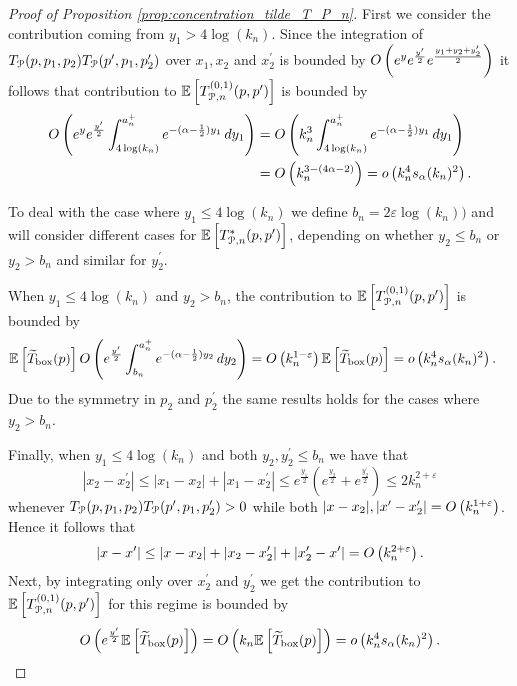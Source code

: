 \begin{proof}[Proof of Proposition \ref{prop:concentration_tilde_T_P_n}]
First we consider the contribution coming from $y_1 > 4 \log(k_n)$. Since the integration of $T_{{\mathcal P}}(p,p_1,p_2) T_{{\mathcal P}}(p^\prime,p_1,p_2^\prime)$ over $x_1, x_2$ and $x_2^\prime$ is bounded by $O\left(e^{y}e^{\frac{y^\prime}{2}} e^{\frac{y_1 + y_2 + y_2^\prime}{2}}\right)$ it follows that contribution to $\mathbb{E}\left[T^{(0,1)}_{{\mathcal P},n}(p,p^\prime)\right]$ is bounded by
\begin{align*}
	O\left(e^{y}e^{\frac{y^\prime}{2}} \int_{4\log(k_n)}^{a_n^+} e^{-(\alpha - \frac{1}{2})y_1} \, dy_1\right)
	&= O\left(k_n^3 \int_{4\log(k_n)}^{a_n^+} e^{-(\alpha - \frac{1}{2})y_1} \, dy_1\right)\\
	&= O\left(k_n^{3 - (4\alpha - 2)}\right) = o\left(k_n^4 s_\alpha(k_n)^2\right).
\end{align*}

To deal with the case where $y_1 \le 4\log(k_n)$ we define $b_n = 2\varepsilon\log(k_n))$ and will consider different cases for $\mathbb{E}\left[T^\ast_{{\mathcal P},n}(p,p^\prime)\right]$, depending on whether $y_2 \le b_n$ or $y_2 > b_n$ and similar for $y_2^\prime$. 

When $y_1 \le 4\log(k_n)$ and $y_2 > b_n$, the contribution to $\mathbb{E}\left[T^{(0,1)}_{{\mathcal P},n}(p,p^\prime)\right]$ is bounded by
\begin{align*}
	\mathbb{E}\left[\widetilde{T}_{\text{box}}(p)\right]
		O\left(e^{\frac{y^\prime}{2}}\int_{b_n}^{a_n^+} e^{-(\alpha -\frac{1}{2})y_2} \, dy_2\right)
	&= O\left(k_n^{1 - \varepsilon}\right)\mathbb{E}\left[\widetilde{T}_{\text{box}}(p)\right]
	= o\left(k_n^4 s_\alpha(k_n)^2\right).
\end{align*}
Due to the symmetry in $p_2$ and $p_2^\prime$ the same results holds for the cases where $y_2 > b_n$.

Finally, when $y_1 \le 4\log(k_n)$ and both $y_2, y_2^\prime \le b_n$ we have that
\[
	|x_2 - x_2^\prime| \le |x_1 - x_2| + |x_1 - x_2^\prime| \le e^{\frac{y_1}{2}}\left(e^{\frac{y_2}{2}} + e^{\frac{y_2^\prime}{2}}\right) \le 2k_n^{2+\varepsilon}
\]
whenever $T_{{\mathcal P}}(p,p_1,p_2) T_{{\mathcal P}}(p^\prime,p_1,p_2^\prime) > 0$ while both $|x - x_2|, |x^\prime - x_2^\prime| = O\left(k_n^{1 + \varepsilon}\right)$. Hence it follows that
\[
	|x - x^\prime| \le |x - x_2| + |x_2 - x_2^\prime| + |x_2^\prime - x^\prime| = O\left(k_n^{2 + \varepsilon}\right).
\]
Next, by integrating only over $x_2^\prime$ and $y_2^\prime $ we get the contribution to $\mathbb{E}\left[T^{(0,1)}_{{\mathcal P},n}(p,p^\prime)\right]$ for this regime is bounded by
\[
	O\left(e^{\frac{y^\prime}{2}} \mathbb{E}\left[\widetilde{T}_{\text{box}}(p)\right]\right)
	= O\left(k_n \mathbb{E}\left[\widetilde{T}_{\text{box}}(p)\right]\right) = o\left(k_n^4 s_\alpha(k_n)^2\right).
\]



%

\end{proof}

